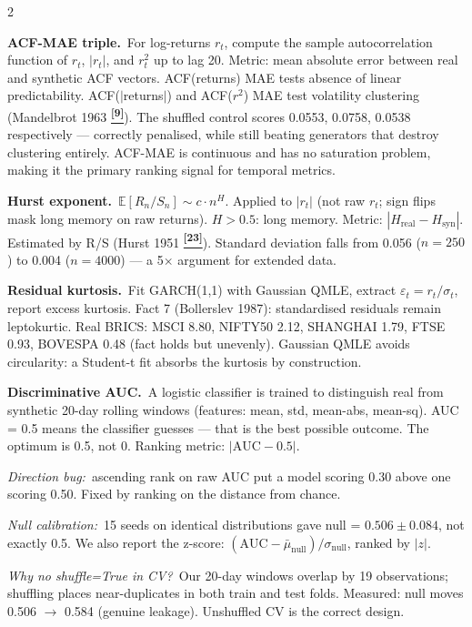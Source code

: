 \documentclass[10pt]{article}
\newcommand{\purplebox}[2]{\begin{tcolorbox}[mybox={Purple}{LBg},title={#1}]#2\end{tcolorbox}}
\newcommand{\tcite}[1]{%
  \hyperlink{R:#1}{\textsuperscript{\scriptsize\textbf{[#1]}}}}
\newcommand{\E}{\mathbb{E}}
\begin{document}
\begin{multicols}{2}
\columnbreak

\purplebox{\textbf{Temporal Group} (ordering-sensitive, 7 metrics)}{%
\textbf{ACF-MAE triple.}\ For log-returns $r_t$, compute the sample autocorrelation function of $r_t$, $|r_t|$, and $r_t^2$ up to lag 20. Metric: mean absolute error between real and synthetic ACF vectors. ACF(returns) MAE tests absence of linear predictability. ACF($|$returns$|$) and ACF($r^2$) MAE test volatility clustering (Mandelbrot 1963\tcite{9}). The shuffled control scores 0.0553, 0.0758, 0.0538 respectively --- correctly penalised, while still beating generators that destroy clustering entirely. ACF-MAE is continuous and has no saturation problem, making it the primary ranking signal for temporal metrics.

\smallskip
\textbf{Hurst exponent.}\ $\E[R_n/S_n] \sim c\cdot n^H$. Applied to $|r_t|$ (not raw $r_t$; sign flips mask long memory on raw returns). $H>0.5$: long memory. Metric: $|H_\text{real}-H_\text{syn}|$. Estimated by R/S (Hurst 1951\tcite{23}). Standard deviation falls from 0.056 ($n=250$) to 0.004 ($n=4000$) --- a 5$\times$ argument for extended data.

\smallskip
\textbf{Residual kurtosis.}\ Fit GARCH(1,1) with Gaussian QMLE, extract $\varepsilon_t = r_t/\sigma_t$, report excess kurtosis. Fact 7 (Bollerslev 1987): standardised residuals remain leptokurtic. Real BRICS: MSCI 8.80, NIFTY50 2.12, SHANGHAI 1.79, FTSE 0.93, BOVESPA 0.48 (fact holds but unevenly). Gaussian QMLE avoids circularity: a Student-t fit absorbs the kurtosis by construction.

\smallskip
\textbf{Discriminative AUC.}\ A logistic classifier is trained to distinguish real from synthetic 20-day rolling windows (features: mean, std, mean-abs, mean-sq). AUC = 0.5 means the classifier guesses --- that is the best possible outcome. The optimum is 0.5, not 0. Ranking metric: $|\text{AUC}-0.5|$.

\smallskip
\textit{Direction bug:}\ ascending rank on raw AUC put a model scoring 0.30 above one scoring 0.50. Fixed by ranking on the distance from chance.

\smallskip
\textit{Null calibration:}\ 15 seeds on identical distributions gave null = $0.506 \pm 0.084$, not exactly 0.5. We also report the z-score: $(\text{AUC} - \bar{\mu}_\text{null})/\sigma_\text{null}$, ranked by $|z|$.

\smallskip
\textit{Why no shuffle=True in CV?}\ Our 20-day windows overlap by 19 observations; shuffling places near-duplicates in both train and test folds. Measured: null moves 0.506 $\to$ 0.584 (genuine leakage). Unshuffled CV is the correct design.}

\end{multicols}
\end{document}
